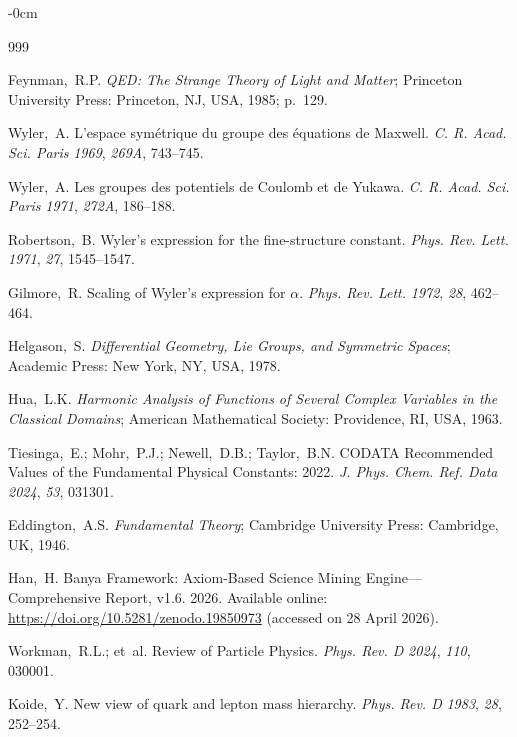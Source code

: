 \documentclass[entropy,article,submit,pdftex,oneauthor]{Definitions/mdpi}
\begin{document}
\begin{adjustwidth}{-\extralength}{0cm}


\begin{thebibliography}{999}

Feynman,~R.P. \textit{QED: The Strange Theory of Light and Matter}; Princeton University Press: Princeton, NJ, USA, 1985; p.~129.

Wyler,~A. L'espace sym\'{e}trique du groupe des \'{e}quations de Maxwell. \textit{C. R. Acad. Sci. Paris} \emph{1969}, \textit{269A}, 743--745.

Wyler,~A. Les groupes des potentiels de Coulomb et de Yukawa. \textit{C. R. Acad. Sci. Paris} \emph{1971}, \textit{272A}, 186--188.

Robertson,~B. Wyler's expression for the fine-structure constant. \textit{Phys. Rev. Lett.} \emph{1971}, \textit{27}, 1545--1547.

Gilmore,~R. Scaling of Wyler's expression for $\alpha$. \textit{Phys. Rev. Lett.} \emph{1972}, \textit{28}, 462--464.

Helgason,~S. \textit{Differential Geometry, Lie Groups, and Symmetric Spaces}; Academic Press: New York, NY, USA, 1978.

Hua,~L.K. \textit{Harmonic Analysis of Functions of Several Complex Variables in the Classical Domains}; American Mathematical Society: Providence, RI, USA, 1963.

Tiesinga,~E.; Mohr,~P.J.; Newell,~D.B.; Taylor,~B.N. CODATA Recommended Values of the Fundamental Physical Constants: 2022. \textit{J. Phys. Chem. Ref. Data} \emph{2024}, \textit{53}, 031301.

Eddington,~A.S. \textit{Fundamental Theory}; Cambridge University Press: Cambridge, UK, 1946.

Han,~H. Banya Framework: Axiom-Based Science Mining Engine---Comprehensive Report, v1.6. 2026. Available online: \url{https://doi.org/10.5281/zenodo.19850973} (accessed on 28 April 2026).

Workman,~R.L.; et~al. Review of Particle Physics. \textit{Phys. Rev. D} \emph{2024}, \textit{110}, 030001.

Koide,~Y. New view of quark and lepton mass hierarchy. \textit{Phys. Rev. D} \emph{1983}, \textit{28}, 252--254.


\end{thebibliography}
\end{adjustwidth}
\end{document}
